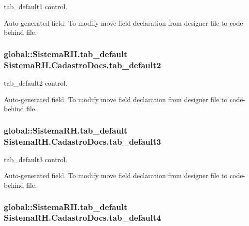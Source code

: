 tab\_\-default1 control. 

Auto-\/generated field. To modify move field declaration from designer file to code-\/behind file. \hypertarget{class_sistema_r_h_1_1_cadastro_docs_ac813ec9ac8f627e74066746c0733114c}{
\subsubsection[{tab\_\-default2}]{\setlength{\rightskip}{0pt plus 5cm}global::SistemaRH.tab\_\-default {\bf SistemaRH.CadastroDocs.tab\_\-default2}}}
\label{class_sistema_r_h_1_1_cadastro_docs_ac813ec9ac8f627e74066746c0733114c}


tab\_\-default2 control. 

Auto-\/generated field. To modify move field declaration from designer file to code-\/behind file. \hypertarget{class_sistema_r_h_1_1_cadastro_docs_af699a2c2389bdf5e1dcf7a2e8e3c9ce0}{
\subsubsection[{tab\_\-default3}]{\setlength{\rightskip}{0pt plus 5cm}global::SistemaRH.tab\_\-default {\bf SistemaRH.CadastroDocs.tab\_\-default3}}}
\label{class_sistema_r_h_1_1_cadastro_docs_af699a2c2389bdf5e1dcf7a2e8e3c9ce0}


tab\_\-default3 control. 

Auto-\/generated field. To modify move field declaration from designer file to code-\/behind file. \hypertarget{class_sistema_r_h_1_1_cadastro_docs_a55a5a3ad3248d1048b0f0ea60012059c}{
\subsubsection[{tab\_\-default4}]{\setlength{\rightskip}{0pt plus 5cm}global::SistemaRH.tab\_\-default {\bf SistemaRH.CadastroDocs.tab\_\-default4}}}
\label{class_sistema_r_h_1_1_cadastro_docs_a55a5a3ad3248d1048b0f0ea60012059c}


